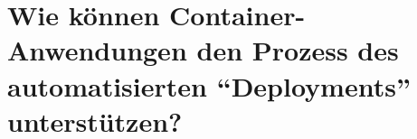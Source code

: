 \chapter{Wie können Container-Anwendungen den Prozess des automatisierten \enquote{Deployments} unterstützen?}